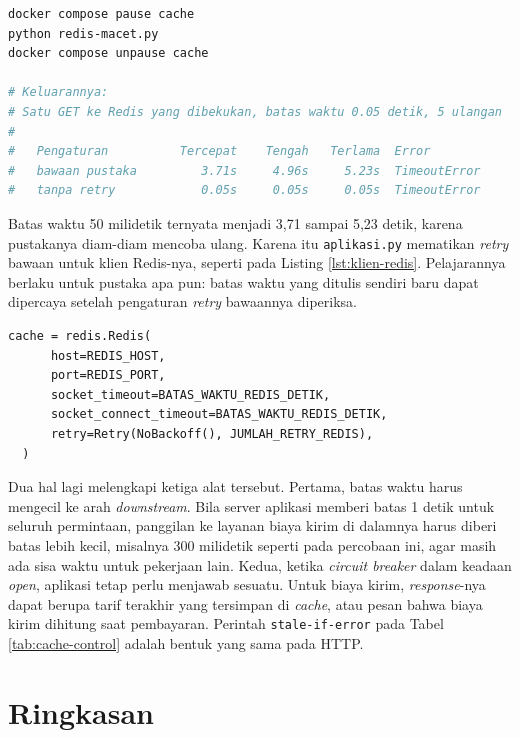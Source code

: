 \begin{lstlisting}[language=bash, caption={Satu GET ke Redis yang macet, tersedia di \berkas{sources/chapter04/redis-macet.py}}, label={lst:redis-macet}]
docker compose pause cache
python redis-macet.py
docker compose unpause cache

# Keluarannya:
# Satu GET ke Redis yang dibekukan, batas waktu 0.05 detik, 5 ulangan
#
#   Pengaturan          Tercepat    Tengah   Terlama  Error
#   bawaan pustaka         3.71s     4.96s     5.23s  TimeoutError
#   tanpa retry            0.05s     0.05s     0.05s  TimeoutError
\end{lstlisting}

Batas waktu 50 milidetik ternyata menjadi 3,71 sampai 5,23 detik, karena
pustakanya diam-diam mencoba ulang. Karena itu \texttt{aplikasi.py} mematikan
\textit{retry} bawaan untuk klien Redis-nya, seperti pada Listing
\ref{lst:klien-redis}. Pelajarannya berlaku untuk pustaka apa pun: batas waktu
yang ditulis sendiri baru dapat dipercaya setelah pengaturan \textit{retry}
bawaannya diperiksa.

\begin{lstlisting}[style=PythonStyle, caption={Klien Redis dengan batas waktu yang benar-benar menjadi batas, tersedia di \berkas{sources/chapter04/aplikasi.py}}, label={lst:klien-redis}]
  cache = redis.Redis(
      host=REDIS_HOST,
      port=REDIS_PORT,
      socket_timeout=BATAS_WAKTU_REDIS_DETIK,
      socket_connect_timeout=BATAS_WAKTU_REDIS_DETIK,
      retry=Retry(NoBackoff(), JUMLAH_RETRY_REDIS),
  )
\end{lstlisting}

Dua hal lagi melengkapi ketiga alat tersebut. Pertama, batas waktu harus
mengecil ke arah \textit{downstream}. Bila server aplikasi memberi batas 1 detik untuk
seluruh permintaan, panggilan ke layanan biaya kirim di dalamnya harus diberi
batas lebih kecil, misalnya 300 milidetik seperti pada percobaan ini, agar
masih ada sisa waktu untuk pekerjaan lain. Kedua, ketika \textit{circuit
breaker} dalam keadaan \textit{open}, aplikasi tetap perlu menjawab sesuatu.
Untuk biaya kirim, \textit{response}-nya dapat
berupa tarif terakhir yang tersimpan di \textit{cache}, atau pesan bahwa biaya
kirim dihitung saat pembayaran. Perintah \texttt{stale-if-error} pada Tabel
\ref{tab:cache-control} adalah bentuk yang sama pada HTTP.

\section{Ringkasan}

